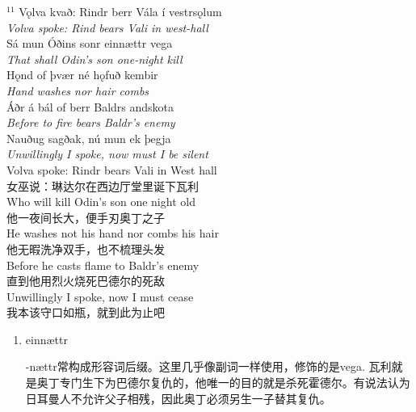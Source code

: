 \begin{paracol}{2}
  \noindent
  $^{11}$ Vǫlva kvað: Rindr berr Vála í vestrsǫlum\\
  \textit{Volva spoke: Rind bears Vali in west-hall}\\
  Sá mun Óðins sonr einnættr vega\\
  \textit{That shall Odin's son one-night kill}\\
  Hǫnd of þvær né hǫfuð kembir\\
  \textit{Hand washes nor hair combs}\\
  Áðr á bál of berr Baldrs andskota\\
  \textit{Before to fire bears Baldr's enemy}\\
  Nauðug sagðak, nú mun ek þegja\\
  \textit{Unwillingly I spoke, now must I be silent}\\
  \switchcolumn
  \noindent
  Volva spoke: Rindr bears Vali in West hall\\
  女巫说：琳达尔在西边厅堂里诞下瓦利\\
  Who will kill Odin's son one night old\\
  他一夜间长大，便手刃奥丁之子\\
  He washes not his hand nor combs his hair\\
  他无暇洗净双手，也不梳理头发\\
  Before he casts flame to Baldr's enemy\\
  直到他用烈火烧死巴德尔的死敌\\
  Unwillingly I spoke, now I must cease\\
  我本该守口如瓶，就到此为止吧\\
\end{paracol}
\begin{grammar*}{}
  \begin{enumerate}[leftmargin=*]
    \item einnættr

          -nættr常构成形容词后缀。这里几乎像副词一样使用，修饰的是vega. 瓦利就是奥丁专门生下为巴德尔复仇的，他唯一的目的就是杀死霍德尔。有说法认为日耳曼人不允许父子相残，因此奥丁必须另生一子替其复仇。
  \end{enumerate}
\end{grammar*}

